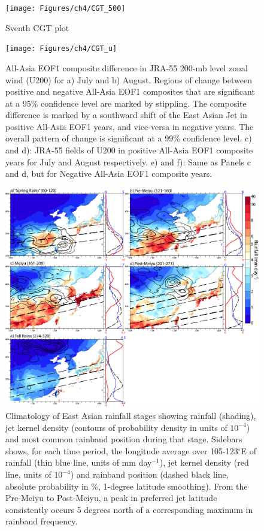 \begin{figure}
\centering
\noindent\texttt{[image: Figures/ch4/CGT\_500]}
\caption{Sventh CGT plot}
\label{fig:cgt_500}
\end{figure}

\begin{figure}
\centering
\noindent\texttt{[image: Figures/ch4/CGT\_u]}
\caption{All-Asia EOF1 composite difference in JRA-55 200-mb level zonal wind (U200) for a) July and b) August. Regions of change between positive and negative All-Asia EOF1 composites that are significant at a 95\% confidence level are marked by stippling. The composite difference is marked by a southward shift of the East Asian Jet in positive All-Asia EOF1 years, and vice-versa in negative years. The overall pattern of change is significant at a 99\% confidence level. c) and d): JRA-55 fields of U200 in positive All-Asia EOF1 composite years for July and August respectively. e) and f): Same as Panels c and d, but for Negative All-Asia EOF1 composite years.}
\label{fig:cgt_u}
\end{figure}

\begin{figure}
\centering
\noindent\includegraphics[width=36pc]{Figures/ch4/climo}
\caption{Climatology of East Asian rainfall stages showing rainfall (shading), jet kernel density (contours of probability density in units of $10^{-4}$) and most common rainband position during that stage. Sidebars shows, for each time period, the longitude average over 105-123$^{\circ}$E of rainfall (thin blue line, units of mm day$^{-1}$), jet kernel density (red line, units of $10^{-4}$) and rainband position (dashed black line, absolute probability in \%, 1-degree latitude smoothing). From the Pre-Meiyu to Post-Meiyu, a peak in preferred jet latitude consistently occurs 5 degrees north of a corresponding maximum in rainband frequency.}
\label{fig:climo}
\end{figure}


